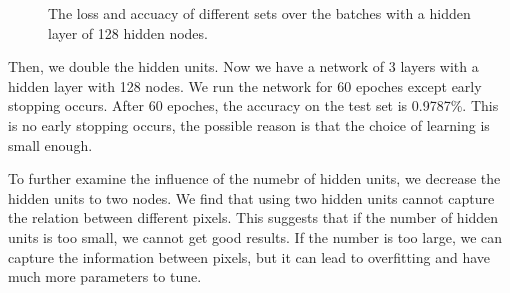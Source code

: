 \documentclass{article} %
\begin{document}
\begin{figure} [!htbp]
	
	\caption{The loss and accuacy of different sets over the batches with a hidden layer of 128 hidden nodes. }  
	
\end{figure}
Then, we double the hidden units. Now we have a network of 3 layers with a hidden layer with 128 nodes. We run the network for 60 epoches except early stopping occurs. After 60 epoches, the accuracy on the test set is 0.9787\%. This is no early stopping occurs, the possible reason is that the choice of learning is small enough.

To further examine the influence of the numebr of hidden units, we decrease the hidden units to two nodes. We find that using two hidden units cannot capture the relation between different pixels. This suggests that if the number of
hidden units is too small, we cannot get good results. If the number is too large, we can capture the information between pixels, but it can lead to overfitting and have much more parameters to tune.
\end{document}
